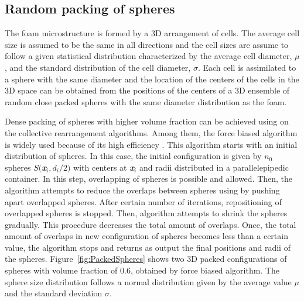 \documentclass[review]{elsarticle}
\begin{document}
\subsection{Random packing of spheres}
The foam microstructure is formed by a 3D arrangement of cells. The average cell size is assumed to be the same in all directions and the cell sizes are assume to follow a given statistical distribution characterized by the average cell diameter, $\mu$, and the standard distribution of the cell diameter, $\sigma$. Each cell is assimilated to a sphere with the same diameter and the location of the centers of the cells in the 3D space can be obtained from the positions of the centers of a 3D ensemble of random close packed spheres with the same diameter distribution as the foam.

Dense packing of spheres with higher volume fraction can be achieved using on the collective rearrangement algorithms. Among them, the force biased algorithm is widely used because of its high efficiency \citep{bargiel1991c}.  This algorithm starts with an initial distribution of spheres. In this case, the initial configuration is given by $n_0$ spheres $S($\textit{\textbf{x}}$_i,d_i/2)$  with centers at \textit{\textbf{x}}$_i$  and radii  distributed in a parallelepipedic container. In this step, overlapping of spheres is possible and allowed. Then, the algorithm attempts to reduce the overlaps between spheres using by pushing apart overlapped spheres. After certain number of iterations, repositioning of overlapped spheres is stopped. Then, algorithm attempts to shrink the spheres gradually. This procedure decreases the total amount of overlaps. Once, the total amount of overlaps in new configuration of spheres becomes less than a certain value, the algorithm stops and returns as output the final positions and radii of the spheres. Figure~\ref{fig:PackedSpheres} shows two 3D packed configurations of spheres with volume fraction of 0.6, obtained by force biased algorithm.  The sphere size distribution follows a normal distribution given by the average value $\mu$ and the standard deviation $\sigma$.
\end{document}
